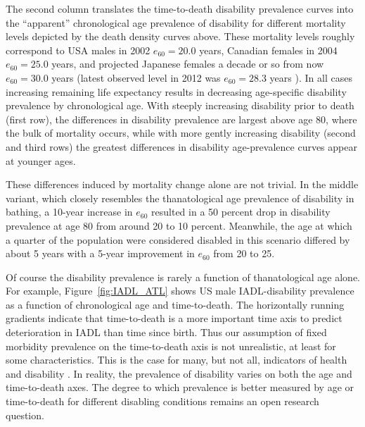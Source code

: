\documentclass[11pt,oneside,a4paper]{article} %
\begin{document}
The second column translates the time-to-death disability prevalence curves into
the ``apparent'' chronological age prevalence of disability for different
mortality levels depicted by the death density curves above. These mortality
levels roughly correspond to USA males in 2002 $e_{60} = 20.0$ years, Canadian
females in 2004 $e_{60} = 25.0$ years, and projected Japanese females a decade
or so from now $e_{60} = 30.0$ years (latest observed level in 2012 was $e_{60}
= 28.3$ years \citep{HMD2015}). In all cases increasing remaining life
expectancy results in decreasing age-specific disability prevalence by
chronological age. With steeply increasing disability prior to death (first
row), the differences in disability prevalence are largest above age 80, where
the bulk of mortality occurs, while with more gently increasing disability
(second and third rows) the greatest differences in disability age-prevalence
curves appear at younger ages.

These differences induced by mortality change alone are not trivial. In the middle variant, which closely resembles the thanatological age prevalence of disability in bathing, a 10-year increase in $e_{60}$  resulted in a 50 percent drop in disability prevalence at age 80 from around 20 to 10 percent. Meanwhile, the age at which a quarter of the population were considered disabled in this scenario differed by about 5 years with a 5-year improvement in $e_{60}$ from 20 to 25.

Of course the disability prevalence is rarely a function of thanatological age
alone. For example, Figure~\ref{fig:IADL_ATL} shows US male
IADL-disability prevalence as a function of chronological age and time-to-death.
The horizontally running gradients indicate that time-to-death is a more important time axis to predict deterioration in IADL than
time since birth. Thus our assumption of fixed morbidity prevalence on the
time-to-death axis is not unrealistic, at least for some characteristics. This
is the case for many, but not all, indicators of health and disability \citep{riffe2015ttd}. In
reality, the prevalence of disability varies on both the age and
time-to-death axes. The degree to which prevalence is better measured by age or
time-to-death for different disabling conditions remains an open research
question.
\end{document}
